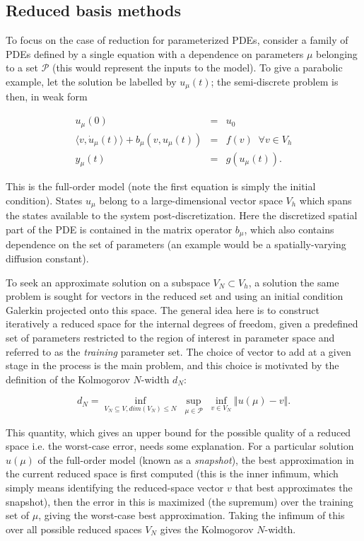 \subsection{Reduced basis methods} \label{RBmethods}

To focus on the case of reduction for parameterized PDEs, consider a family of PDEs defined by a single equation with a dependence on parameters $\mu$ belonging to a set $\mathcal{P}$ (this would represent the inputs to the model).  
To give a parabolic example, let the solution be labelled by $u_{\mu}(t)$; the semi-discrete problem is then, in weak form 

\begin{eqnarray}
u_{\mu}(0) &=& u_0\\
\langle v, \dot{u}_{\mu}(t) \rangle + b_{\mu} \left ( v, u_{\mu}(t) \right ) &=& f(v) \; \; \forall v \in V_h\\
y_{\mu}(t) &=& g(u_{\mu}(t)).
\end{eqnarray}

This is the full-order model (note the first equation is simply the initial condition).  
States $u_{\mu}$ belong to a large-dimensional vector space $V_h$ which spans the states available to the system post-discretization.  
Here the discretized spatial part of the PDE is contained in the matrix operator $b_{\mu}$, which also contains dependence on the set of parameters (an example would be a spatially-varying diffusion constant). 

To seek an approximate solution on a subspace $V_N \subset V_h$, a solution the same problem is sought for vectors in the reduced set and using an initial condition Galerkin projected onto this space.  
The general idea here is to construct iteratively a reduced space for the internal degrees of freedom, given a predefined set of parameters restricted to the region of interest in parameter space and referred to as the {\it training} parameter set.  
The choice of vector to add at a given stage in the process is the main problem, and this choice is motivated by the definition of the Kolmogorov $N$-width $d_N$:

\begin{equation}
d_N = \underset{V_N \subseteq V, dim(V_N) \leq N}{\inf} \; \underset{\mu \in \mathcal{P}}{\sup} \; \underset{v \in V_N}{\inf} \Vert u(\mu) -v \Vert. 
\end{equation}

This quantity, which gives an upper bound for the possible quality of a reduced space i.e. the worst-case error, needs some explanation.  
For a particular solution $u(\mu)$ of the full-order model (known as a {\it snapshot}), the best approximation in the current reduced space is first computed (this is the inner infimum, which simply means identifying the reduced-space vector $v$ that best approximates the snapshot), then the error in this is maximized (the supremum) over the training set of $\mu$, giving the worst-case best approximation.  
Taking the infimum of this over all possible reduced spaces $V_N$ gives the Kolmogorov $N$-width.


